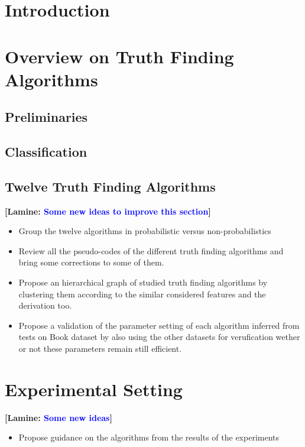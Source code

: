\documentclass{vldb}
\newcommand{\lamine}[1]{\textbf{[Lamine: \textcolor{blue}{#1}]}}
\begin{document}
\section{Introduction}
\section{Overview on Truth Finding Algorithms}
\subsection{Preliminaries}
\subsection{Classification}
\subsection{Twelve Truth Finding Algorithms}
\lamine{Some new ideas to improve this section}
\begin{itemize}
\item Group the twelve algorithms in probabilistic versus non-probabilistics
 \item Review all the pseudo-codes of the different truth finding 
 algorithms and bring some corrections to some of them.
 \item Propose an hierarchical graph of studied truth finding algorithms
 by clustering them according to the similar considered features and the 
 derivation too.
 \item Propose a validation of the parameter setting of each algorithm
 inferred from tests on Book dataset by also using the other datasets
 for verufication wether or not these parameters remain still efficient.
\end{itemize}

\section{Experimental Setting}
\lamine{Some new ideas}
\begin{itemize}
 \item Propose guidance  on the algorithms from the results of the experiments
\end{itemize}
\end{document}
